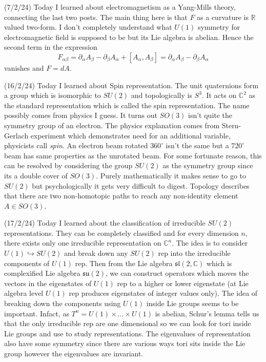 \documentclass[12pt,a4paper]{article}
\newcommand{\R}{\mathbb{R}}
\newcommand{\C}{\mathbb{C}}
\begin{document}
(7/2/24) Today I learned about electromagnetism as a Yang-Mills theory, connecting the last two posts. %
The main thing here is that $ F $ as a curvature is $ \R $ valued two-form. I don't completely understand what $ U(1) $ symmetry for electromagnetic field is supposed to be but its Lie algebra is abelian. Hence the second term in the expression 
\[ F_{\alpha \beta} = \partial_{\alpha}A_{\beta} - \partial_{\beta}A_{\alpha} + [A_{\alpha}, A_{\beta}] = \partial_{\alpha}A_{\beta} - \partial_{\beta}A_{\alpha} \]
vanishes and $ F = dA $.

(16/2/24) Today I learned about Spin representation. The unit quaternions form a group which is isomorphic to $ SU(2) $ and topologically is $ S^{3} $. It acts on $ \C^{2} $ as the standard representation which is called the spin representation. The name possibly comes from physics I guess. It turns out $ SO(3) $ isn't quite the symmetry group of an electron. The physics explanation comes from Stern-Gerlach experiment which demonstrates need for an additional variable, physicists call \textit{spin}. An electron beam rotated $ 360^{\circ} $ isn't the same but a $ 720^{\circ} $ beam has same properties as the unrotated beam. For some fortunate reason, this can be resolved by considering the group $ SU(2) $ as the symmetry group since its a double cover of $ SO(3) $. Purely mathematically it makes sense to go to $ SU(2) $ but psychologically it gets very difficult to digest. Topology describes that there are two non-homotopic paths to reach any non-identity element $A \in SO(3) $.

(17/2/24) Today I learned about the classification of irreducible $ SU(2) $ representations. They can be completely classified and for every dimension $ n $, there exists only one irreducible representation on $ \C^{n} $. The idea is to consider $ U(1) \hookrightarrow SU(2)$ and break down any $ SU(2) $ rep into the irreducible components of $ U(1) $ rep. Then from the Lie algebra $ \mathfrak{sl}(2,\C) $ which is complexified Lie algebra $ \mathfrak{su}(2) $, we can construct operators which moves the vectors in the eigenstates of $ U(1) $ rep to a higher or lower eigenstate (at Lie algebra level $ U(1) $ rep produces eigenstates of integer values only). The idea of breaking down the components using $ U(1) $ inside Lie groups seems to be important. Infact,  as $ T^{n} = U(1) \times \dots \times U(1) $ is abelian, Schur's lemma tells us that the only irreducible rep are one dimensional so we can look for tori inside Lie groups and use to study representations. The eigenvalues of representation also have some symmetry since there are various ways tori sits inside the Lie group however the eigenvalues are invariant.
\end{document}
